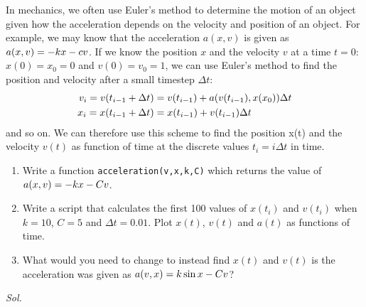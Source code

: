     \begin{problem}\label{problem_2.9}
        In mechanics, we often use Euler's method to determine the motion of an object given how the acceleration depends on the velocity and position of an object. For example, we may know that the acceleration $a(x, v)$ is given as $a\qty(x, v) = - kx - cv$. If we know the position $x$ and the velocity $v$ at a time $t = 0$: $x(0) = x_0 = 0$ and $v(0) = v_0 = 1$, we can use Euler's method to find the position and velocity after a small timestep $\Delta t$:
        \begin{align}
            v_{i} = v\qty(t_{i-1} + \Delta t) & = v\qty(t_{i-1}) + a\qty(v\qty(t_{i-1}),x\qty(x_{0})) \Delta t \\
            x_{i} = x\qty(t_{i-1} + \Delta t) & = x\qty(t_{i-1}) + v\qty(t_{i-1}) \Delta t 
        \end{align}
        and so on. We can therefore use this scheme to find the position x(t) and the velocity $v(t)$ as function of time at the discrete values $t_{i} = i\Delta t$ in time.
        \begin{enumerate}
            \item Write a function \verb|acceleration(v,x,k,C)| which returns the value of $a\qty(x,v)=-kx-Cv$.
            \item Write a script that calculates the first 100 values of $x(t_{i})$ and $v(t_{i})$ when $k=10$, $C=5$ and $\Delta t =0.01$. Plot $x(t)$, $v(t)$ and $a(t)$ as functions of time.
            \item What would you need to change to instead find $x(t)$ and $v(t)$ is the acceleration was given as $a\qty(v,x)=k\sin{x}-Cv$?
        \end{enumerate}
    \end{problem}
    \textit{ Sol. }
    
